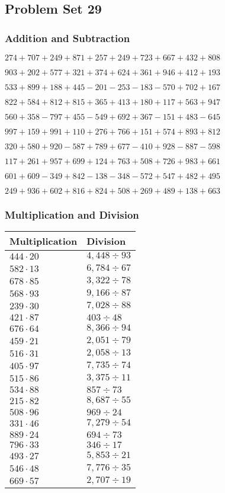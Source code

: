 \hypertarget{problem-set-29-2}{%
\subsection{Problem Set 29}\label{problem-set-29-2}}

\hypertarget{addition-and-subtraction-129}{%
\subsubsection{Addition and
Subtraction}\label{addition-and-subtraction-129}}

\(274 + 707 + 249 + 871 + 257 + 249 + 723 + 667 + 432 + 808\)

\(903 + 202 + 577 + 321 + 374 + 624 + 361 + 946 + 412 + 193\)

\(533 + 899 + 188 + 445 - 201 - 253 - 183 - 570 + 702 + 167\)

\(822 + 584 + 812 + 815 + 365 + 413 + 180 + 117 + 563 + 947\)

\(560 + 358 - 797 + 455 - 549 + 692 + 367 - 151 + 483 - 645\)

\(997 + 159 + 991 + 110 + 276 + 766 + 151 + 574 + 893 + 812\)

\(320 + 580 + 920 - 587 + 789 + 677 - 410 + 928 - 887 - 598\)

\(117 + 261 + 957 + 699 + 124 + 763 + 508 + 726 + 983 + 661\)

\(601 + 609 - 349 + 842 - 138 - 348 - 572 + 547 + 482 + 495\)

\(249 + 936 + 602 + 816 + 824 + 508 + 269 + 489 + 138 + 663\)

\hypertarget{multiplication-and-division-129}{%
\subsubsection{Multiplication and
Division}\label{multiplication-and-division-129}}

\begin{longtable}[]{@{}ll@{}}
\toprule
Multiplication & Division\tabularnewline
\midrule
\endhead
\(444 \cdot 20\) & \(4,448÷93\)\tabularnewline
\(582 \cdot 13\) & \(6,784÷67\)\tabularnewline
\(678 \cdot 85\) & \(3,322÷78\)\tabularnewline
\(568 \cdot 93\) & \(9,166÷87\)\tabularnewline
\(239 \cdot 30\) & \(7,028÷88\)\tabularnewline
\(421 \cdot 87\) & \(403÷48\)\tabularnewline
\(676 \cdot 64\) & \(8,366÷94\)\tabularnewline
\(459 \cdot 21\) & \(2,051÷79\)\tabularnewline
\(516 \cdot 31\) & \(2,058÷13\)\tabularnewline
\(405 \cdot 97\) & \(7,735÷74\)\tabularnewline
\(515 \cdot 86\) & \(3,375÷11\)\tabularnewline
\(534 \cdot 88\) & \(857÷73\)\tabularnewline
\(215 \cdot 82\) & \(8,687÷55\)\tabularnewline
\(508 \cdot 96\) & \(969÷24\)\tabularnewline
\(331 \cdot 46\) & \(7,279÷54\)\tabularnewline
\(889 \cdot 24\) & \(694÷73\)\tabularnewline
\(796 \cdot 33\) & \(346÷17\)\tabularnewline
\(493 \cdot 27\) & \(5,853÷21\)\tabularnewline
\(546 \cdot 48\) & \(7,776÷35\)\tabularnewline
\(669 \cdot 57\) & \(2,707÷19\)\tabularnewline
\bottomrule
\end{longtable}

